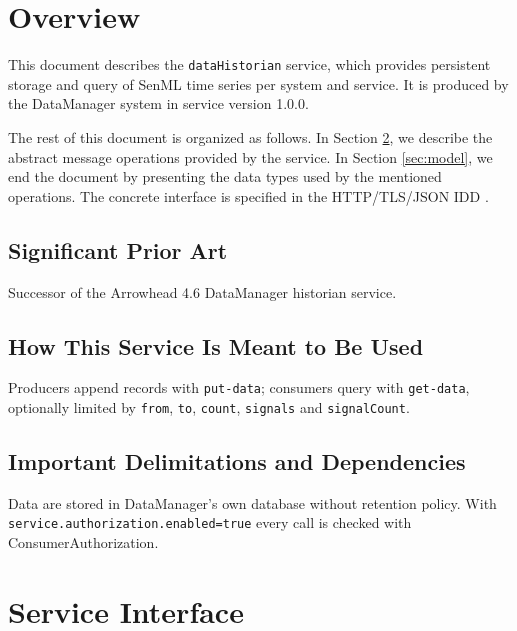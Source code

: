 \documentclass[a4paper]{arrowhead}
\begin{document}
\section{Overview}
\label{sec:overview}

This document describes the \texttt{dataHistorian} service, which provides persistent storage and query of SenML time series per system and service.
It is produced by the DataManager system \cite{dm-sysd} in service version 1.0.0.

The rest of this document is organized as follows.
In Section \ref{sec:operations}, we describe the abstract message operations provided by the service.
In Section \ref{sec:model}, we end the document by presenting the data types used by the mentioned operations.
The concrete interface is specified in the HTTP/TLS/JSON IDD \cite{dm-dataHistorian-http-idd}.

\subsection{Significant Prior Art}

Successor of the Arrowhead 4.6 DataManager historian service.

\subsection{How This Service Is Meant to Be Used}

Producers append records with \texttt{put-\allowbreak{}data}; consumers query with \texttt{get-\allowbreak{}data}, optionally limited by \texttt{from}, \texttt{to}, \texttt{count}, \texttt{signals} and \texttt{signalCount}.

\subsection{Important Delimitations and Dependencies}
\label{sec:delimitations}

Data are stored in DataManager's own database without retention policy. With \texttt{service.\allowbreak{}authorization.\allowbreak{}enabled=\allowbreak{}true} every call is checked with Consumer\allowbreak{}Authorization.

\newpage

\section{Service Interface}
\label{sec:operations}
\end{document}
